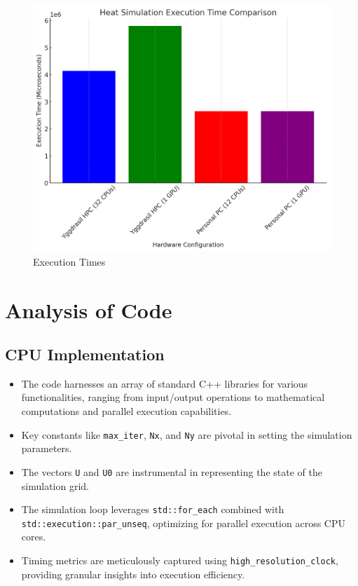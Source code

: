 \begin{figure}
\centering
\includegraphics{img/execution_time.png}
\caption{Execution Times}
\end{figure}

\hypertarget{analysis-of-code}{%
\section{Analysis of Code}\label{analysis-of-code}}

\hypertarget{cpu-implementation}{%
\subsection{CPU Implementation}\label{cpu-implementation}}

\begin{itemize}
\tightlist
\item
  The code harnesses an array of standard C++ libraries for various
  functionalities, ranging from input/output operations to mathematical
  computations and parallel execution capabilities.
\item
  Key constants like \texttt{max\_iter}, \texttt{Nx}, and \texttt{Ny}
  are pivotal in setting the simulation parameters.
\item
  The vectors \texttt{U} and \texttt{U0} are instrumental in
  representing the state of the simulation grid.
\item
  The simulation loop leverages \texttt{std::for\_each} combined with
  \texttt{std::execution::par\_unseq}, optimizing for parallel execution
  across CPU cores.
\item
  Timing metrics are meticulously captured using
  \texttt{high\_resolution\_clock}, providing granular insights into
  execution efficiency.
\end{itemize}

